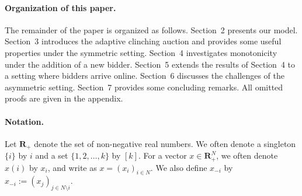 \paragraph{Organization of this paper.}
The remainder of the paper is organized as follows.  
Section~2 presents our model.  
Section~3 introduces the adaptive clinching auction and provides some useful properties under the symmetric setting.  
Section~4 investigates monotonicity under the addition of a new bidder.  
Section~5 extends the results of Section~4 to a setting where bidders arrive online.  
Section~6 discusses the challenges of the asymmetric setting.  
Section~7 provides some concluding remarks.  
All omitted proofs are given in the appendix.



\paragraph{Notation.}
Let $\mathbf R_+$ denote the set of non-negative real numbers. 
We often denote a singleton $\{i\}$ by $i$ and a set $\{1,2,\ldots,k\}$ by $[k]$. For a vector $x\in \mathbf R^N_+$, we often denote $x(i)$ by $x_i$, and write as $x= (x_i)_{i\in N}$. We also define $x_{-i}$ by $x_{-i}:=(x_j)_{j\in N\setminus i}$.